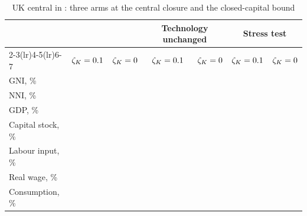 \begin{table}[htbp]
\centering
\caption{UK central in \genHeadYear{}: three arms at the central closure and the closed-capital bound}
\label{tab:headline}
\small
\begin{tabular}{lrrrrrr}
\toprule
 & \multicolumn{2}{c}{\Main{}} & \multicolumn{2}{c}{Technology unchanged} & \multicolumn{2}{c}{Stress test} \\
\cmidrule(lr){2-3}\cmidrule(lr){4-5}\cmidrule(lr){6-7}
 & $\zeta_K = 0.1{}$ & $\zeta_K = 0{}$ & $\zeta_K = 0.1{}$ & $\zeta_K = 0{}$ & $\zeta_K = 0.1{}$ & $\zeta_K = 0{}$ \\
\midrule
GNI, \%                  & \genUkCentralMainGniCentral{} & \genUkCentralMainGniBound{} & \genUkCentralFlatGniCentral{} & \genUkCentralFlatGniBound{} & \genUkCentralStressGniCentral{} & \genUkCentralStressGniBound{} \\
NNI, \%                  & \genUkCentralMainNniCentral{} & \genUkCentralMainNniBound{} & \genUkCentralFlatNniCentral{} & \genUkCentralFlatNniBound{} & \genUkCentralStressNniCentral{} & \genUkCentralStressNniBound{} \\
GDP, \%                  & \genUkCentralMainGdpCentral{} & \genUkCentralMainGdpBound{} & \genUkCentralFlatGdpCentral{} & \genUkCentralFlatGdpBound{} & \genUkCentralStressGdpCentral{} & \genUkCentralStressGdpBound{} \\
Capital stock, \%        & \genUkCentralMainCapitalCentral{} & \genUkCentralMainCapitalBound{} & \genUkCentralFlatCapitalCentral{} & \genUkCentralFlatCapitalBound{} & \genUkCentralStressCapitalCentral{} & \genUkCentralStressCapitalBound{} \\
Labour input, \%         & \genUkCentralMainLabourCentral{} & \genUkCentralMainLabourBound{} & \genUkCentralFlatLabourCentral{} & \genUkCentralFlatLabourBound{} & \genUkCentralStressLabourCentral{} & \genUkCentralStressLabourBound{} \\
Real wage, \%            & \genUkCentralMainWageCentral{} & \genUkCentralMainWageBound{} & \genUkCentralFlatWageCentral{} & \genUkCentralFlatWageBound{} & \genUkCentralStressWageCentral{} & \genUkCentralStressWageBound{} \\
Consumption, \%          & \genUkCentralMainConsumptionCentral{} & \genUkCentralMainConsumptionBound{} & \genUkCentralFlatConsumptionCentral{} & \genUkCentralFlatConsumptionBound{} & \genUkCentralStressConsumptionCentral{} & \genUkCentralStressConsumptionBound{} \\

\end{tabular}
\end{table}
